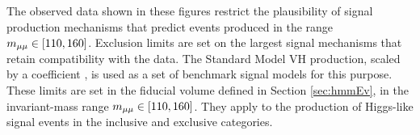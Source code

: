 

The observed data shown in these figures restrict the plausibility of signal production mechanisms that predict events produced in the range $m_{\mu\mu}\in[110,160]$.
Exclusion limits are set on the largest signal mechanisms that retain compatibility with the data.
The Standard Model VH \hmm production, scaled by a coefficient \mus, is used as a set of benchmark signal models for this purpose.
These limits are set in the fiducial volume defined in Section \ref{sec:hmmEv}, in the invariant-mass range $m_{\mu\mu}\in[110,160]$.
They apply to the production of Higgs-like signal events in the inclusive and exclusive categories.

